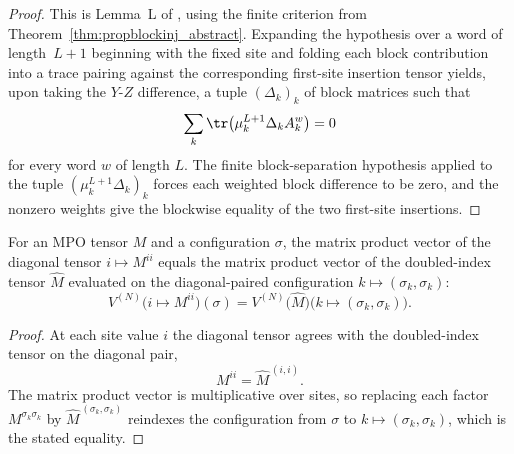 \begin{proof}
    \leanok
    This is Lemma~L of \cite[Appendix~A]{Cirac2016MPDO_arXiv}, using the finite
    criterion from Theorem~\ref{thm:propblockinj_abstract}.
    Expanding the hypothesis over a word of length~$L+1$ beginning with the
    fixed site and folding each block contribution into a trace pairing
    against the corresponding first-site insertion tensor yields, upon taking the
    $Y$-$Z$ difference, a tuple $(\Delta_k)_k$ of block matrices such that
    \[
        \sum_k \tr\bigl(\mu_k^{L+1}\Delta_k A_k^w\bigr)=0
    \]
    for every word $w$ of length $L$. The finite block-separation hypothesis
    applied to the tuple $(\mu_k^{L+1}\Delta_k)_k$ forces each weighted block
    difference to be zero, and the nonzero weights give the blockwise equality
    of the two first-site insertions.
\end{proof}

\begin{lemma}
    \label{lem:mpv_diagonal_tensor}
    \leanok
    For an MPO tensor $M$ and a configuration $\sigma$, the matrix product vector of
    the diagonal tensor $i\mapsto M^{ii}$ equals the matrix product vector of the
    doubled-index tensor $\widehat{M}$ evaluated on the diagonal-paired configuration
    $k\mapsto(\sigma_k,\sigma_k)$:
    \[
        V^{(N)}\bigl(i\mapsto M^{ii}\bigr)(\sigma)
        = V^{(N)}\bigl(\widehat{M}\bigr)\bigl(k\mapsto(\sigma_k,\sigma_k)\bigr).
    \]
\end{lemma}
\begin{proof}\leanok
    At each site value $i$ the diagonal tensor agrees with the doubled-index tensor
    on the diagonal pair,
    \[
        M^{ii} = \widehat{M}^{\,(i,i)}.
    \]
    The matrix product vector is multiplicative over sites, so replacing each factor
    $M^{\sigma_k\sigma_k}$ by $\widehat{M}^{\,(\sigma_k,\sigma_k)}$ reindexes the
    configuration from $\sigma$ to $k\mapsto(\sigma_k,\sigma_k)$, which is the stated
    equality.
\end{proof}

